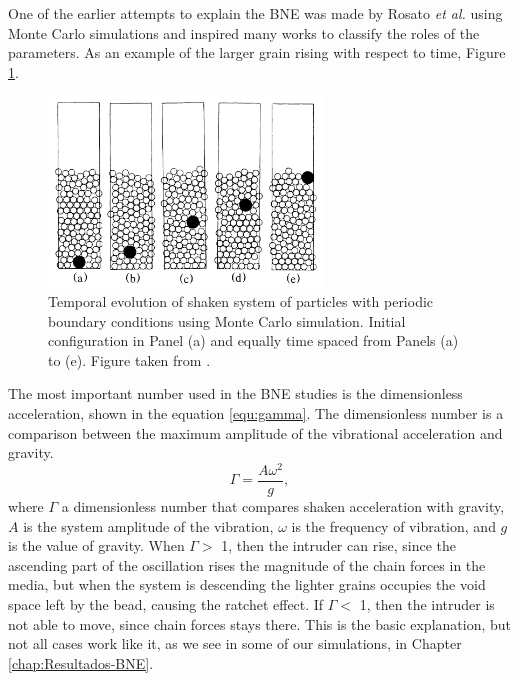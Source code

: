     One of the earlier attempts to explain the BNE was made by Rosato \textit{et al.} \cite{Why_the_Brazil_nuts_are_on_top} using Monte Carlo simulations and inspired many works to classify the roles of the parameters. As an example of the larger grain rising with respect to time, Figure \ref{fig:BNE_rosato}.

\begin{figure}[H]
    \centering
    \includegraphics[width=0.65\textwidth]{04-figuras/BNE_Rosato.png}
    \caption[BNE cycles.]{Temporal evolution of shaken system of particles with periodic boundary conditions using Monte Carlo simulation. Initial configuration in Panel (a) and equally time spaced from Panels (a) to (e). Figure taken from \cite{Why_the_Brazil_nuts_are_on_top}.}
    \label{fig:BNE_rosato}
\end{figure}

    The most important number used in the BNE studies is the dimensionless acceleration, shown in the equation \ref{equ:gamma}. The dimensionless number is a comparison between the maximum amplitude of the vibrational acceleration and gravity. 
\begin{equation}
    \label{equ:gamma}
    \Gamma = \frac{A\omega^{2}}{g},
\end{equation}
where $\Gamma$ a dimensionless number that compares shaken acceleration with gravity, $A$ is the system amplitude of the vibration, $\omega$ is the frequency of vibration, and $g$ is the value of gravity. When $\Gamma > $ 1, then the intruder can rise, since the ascending part of the oscillation rises the magnitude of the chain forces in the media, but when the system is descending the lighter grains occupies the void space left by the bead, causing the ratchet effect. If $\Gamma < $ 1, then the intruder is not able to move, since chain forces stays there. This is the basic explanation, but not all cases work like it, as we see in some of our simulations, in Chapter \ref{chap:Resultados-BNE}.

